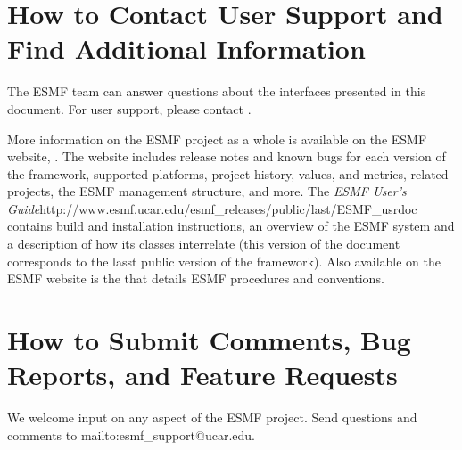 \section{How to Contact User Support and Find Additional Information}
\label{sec:Support}
The ESMF team can answer questions about the interfaces presented in this 
document.  For user support, please contact 
.  

More information on the ESMF project as a whole is available on the 
ESMF website, .  
The website includes release notes and known bugs for each version of the
framework, supported platforms, project history, values, and metrics, related projects,
the ESMF management structure, and more.  The \htmladdnormallink
{{\it ESMF User's Guide}}{http://www.esmf.ucar.edu/esmf_releases/public/last/ESMF_usrdoc} contains build and installation instructions, an overview of the ESMF system and a description of 
how its classes interrelate (this version of the document corresponds to the lasst public version of the framework).  Also available on the ESMF website is the 
that details ESMF procedures and conventions.  
 
\section{How to Submit Comments, Bug Reports, and Feature Requests}
\label{sec:Submission}
We welcome input on any aspect of the ESMF project.  Send
questions and comments to 
{mailto:esmf\_support@ucar.edu}.






